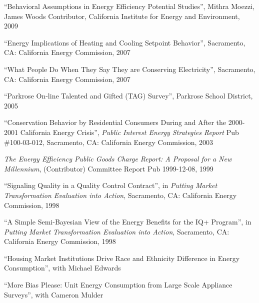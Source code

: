 \documentclass[Computer Science]{vita}
\begin{document}
\begin{vita}
\begin{Publications}
\begin{Unrefereed Public Reports}
    \item ``Behavioral Assumptions in Energy Efficiency Potential
      Studies'', Mithra Moezzi, James Woods Contributor, California
      Institute for Energy and Environment, 2009

    \item ``Energy Implications of Heating and Cooling Setpoint
      Behavior'', Sacramento, CA: California Energy Commission, 2007

    \item ``What People Do When They Say They are Conserving
      Electricity'', Sacramento, CA: California Energy Commission,
      2007

    \item ``Parkrose On-line Talented and Gifted (TAG) Survey'',
      Parkrose School District, 2005

    \item ``Conservation Behavior by Residential Consumers During and
      After the 2000-2001 California Energy Crisis'', \emph{Public
        Interest Energy Strategies Report} Pub \#100-03-012,
      Sacramento, CA: California Energy Commission, 2003

    \item \emph{The Energy Efficiency Public Goods Charge Report: A
        Proposal for a New Millennium}, (Contributor) Committee Report
      Pub 1999-12-08, 1999
	
    \item ``Signaling Quality in a Quality Control Contract'', in
      \emph{Putting Market Transformation Evaluation into Action},
      Sacramento, CA: California Energy Commission, 1998
	
    \item ``A Simple Semi-Bayesian View of the Energy Benefits for the
      IQ+ Program'', in \emph{Putting Market Transformation Evaluation
        into Action}, Sacramento, CA: California Energy Commission,
      1998
	
    \end{Unrefereed Public Reports}
  
    \begin{Work in progress}
    
\item ``Housing Market Institutions Drive Race and Ethnicity Difference in Energy Consumption'', with Michael Edwards

\item ``More Bias Please: Unit Energy Consumption from Large Scale Appliance Surveys'', with Cameron Mulder


\end{Work in progress}
\end{Publications}
\end{vita}
\end{document}
